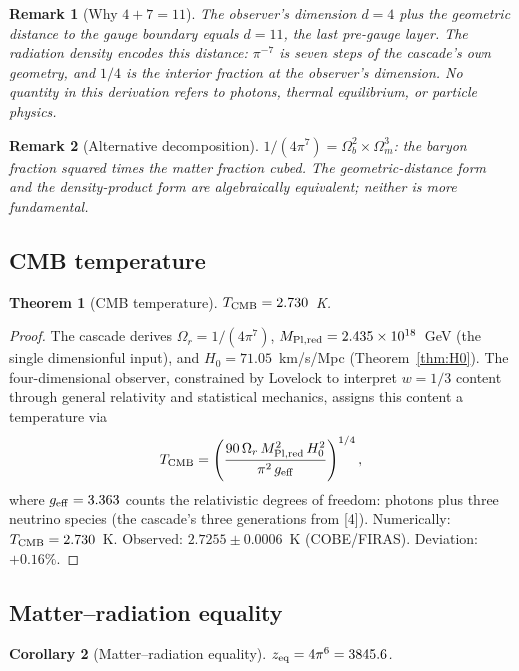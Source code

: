 \documentclass[12pt,a4paper]{article}
\newtheorem{theorem}{Theorem}[section]
\newtheorem{corollary}[theorem]{Corollary}
\newtheorem*{remark}{Remark}
\begin{document}
\begin{remark}[Why $4 + 7 = 11$]
The observer's dimension $d = 4$ plus the geometric distance to the gauge boundary equals
$d = 11$, the last pre-gauge layer. The radiation density encodes this distance: $\pi^{-7}$
is seven steps of the cascade's own geometry, and $1/4$ is the interior fraction at the
observer's dimension. No quantity in this derivation refers to photons, thermal
equilibrium, or particle physics.
\end{remark}

\begin{remark}[Alternative decomposition]
$1/(4\pi^7) = \Omega_b^2 \times \Omega_m^3$: the baryon fraction squared times the matter
fraction cubed. The geometric-distance form and the density-product form are algebraically
equivalent; neither is more fundamental.
\end{remark}

\subsection{CMB temperature}

\begin{theorem}[CMB temperature]
$T_{\rm CMB} = 2.730$~K.
\end{theorem}

\begin{proof}
The cascade derives $\Omega_r = 1/(4\pi^7)$, $M_{\rm Pl,red} = 2.435 \times 10^{18}$~GeV (the
single dimensionful input), and $H_0 = 71.05$~km/s/Mpc (Theorem~\ref{thm:H0}). The
four-dimensional observer, constrained by Lovelock to interpret $w = 1/3$ content through
general relativity and statistical mechanics, assigns this content a temperature via
\[
T_{\rm CMB} = \left(\frac{90\,\Omega_r\,M_{\rm Pl,red}^2\,H_0^2}{\pi^2\,g_{\rm eff}}\right)^{1/4},
\]
where $g_{\rm eff} = 3.363$ counts the relativistic degrees of freedom: photons plus three
neutrino species (the cascade's three generations from [4]).
Numerically: $T_{\rm CMB} = 2.730$~K. Observed: $2.7255 \pm 0.0006$~K (COBE/FIRAS).
Deviation: $+0.16\%$.
\end{proof}

\subsection{Matter--radiation equality}

\begin{corollary}[Matter--radiation equality]
$z_{\rm eq} = 4\pi^6 = 3845.6$.
\end{corollary}
\end{document}
